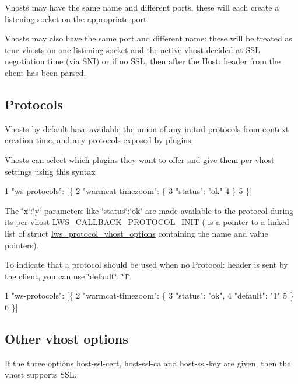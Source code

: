 \begin{DoxyItemize}
\item Vhosts may have the same name and different ports, these will each create a listening socket on the appropriate port.
\item Vhosts may also have the same port and different name\+: these will be treated as true vhosts on one listening socket and the active vhost decided at S\+SL negotiation time (via S\+NI) or if no S\+SL, then after the Host\+: header from the client has been parsed.
\end{DoxyItemize}

\subsection*{Protocols }

Vhosts by default have available the union of any initial protocols from context creation time, and any protocols exposed by plugins.

Vhosts can select which plugins they want to offer and give them per-\/vhost settings using this syntax 
\begin{DoxyCode}
1 "ws-protocols": [\{
2   "warmcat-timezoom": \{
3     "status": "ok"
4   \}
5 \}]
\end{DoxyCode}


The \char`\"{}x\char`\"{}\+:\char`\"{}y\char`\"{} parameters like \char`\"{}status\char`\"{}\+:\char`\"{}ok\char`\"{} are made available to the protocol during its per-\/vhost L\+W\+S\+\_\+\+C\+A\+L\+L\+B\+A\+C\+K\+\_\+\+P\+R\+O\+T\+O\+C\+O\+L\+\_\+\+I\+N\+IT ( is a pointer to a linked list of struct \hyperlink{structlws__protocol__vhost__options}{lws\+\_\+protocol\+\_\+vhost\+\_\+options} containing the name and value pointers).

To indicate that a protocol should be used when no Protocol\+: header is sent by the client, you can use \char`\"{}default\char`\"{}\+: \char`\"{}1\char`\"{} 
\begin{DoxyCode}
1 "ws-protocols": [\{
2   "warmcat-timezoom": \{
3     "status": "ok",
4     "default": "1"
5   \}
6 \}]
\end{DoxyCode}


\subsection*{Other vhost options }


\begin{DoxyItemize}
\item If the three options {\ttfamily host-\/ssl-\/cert}, {\ttfamily host-\/ssl-\/ca} and {\ttfamily host-\/ssl-\/key} are given, then the vhost supports S\+SL.
\end{DoxyItemize}

